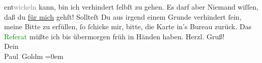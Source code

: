                   ent\textcolor{gray}{wickeln} kann, bin ich verhindert ſelbſt zu gehen. Es darf
               aber Niemand wiſſen, daß du \uline{für mich} gehſt! Sollteſt
               Du aus irgend einem Grunde {\pb}verhindert ſein,  meine Bitte zu erfüllen, ſo
               ſchicke mir, bitte,  die Karte in’s Bureau
               zurück. Das \textcolor{green}{Referat}{}\ledrightnote{\textcolor{green}{?? [Rezension des Gastspiels von Anna Hochenburger, 7.1.1891]}} müßte ich bis übermorgen{ }früh in Händen haben.\pend
           \pstart
           Herzl. Gruß! {\\[\baselineskip]}Dein {\\[\baselineskip]}\spacefill\mbox{Paul Goldm}\pend
           \leftskip=0em{}\endnumbering{}  
      